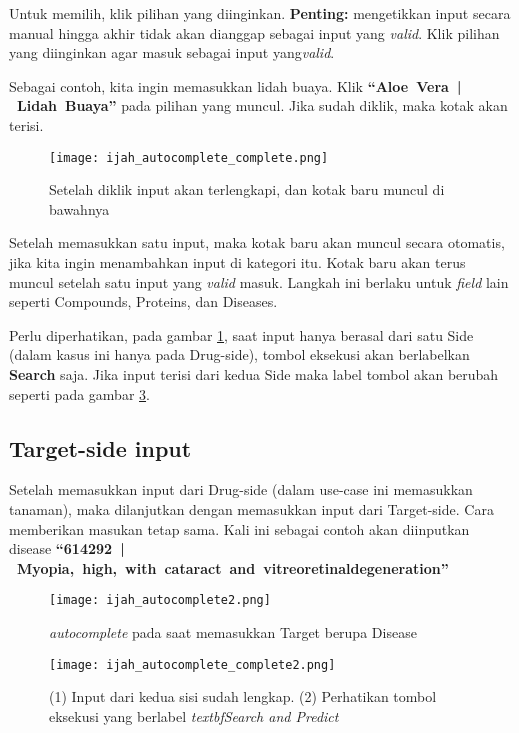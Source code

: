 	Untuk memilih, klik pilihan yang diinginkan. \textbf{Penting:} mengetikkan input secara manual hingga akhir tidak akan dianggap sebagai input yang \emph{valid}. Klik pilihan yang diinginkan agar masuk sebagai input yang\emph{valid}.

	Sebagai contoh, kita ingin memasukkan lidah buaya. Klik \mbox{\textbf{``Aloe Vera | Lidah Buaya''}} pada pilihan yang muncul. Jika sudah diklik, maka kotak akan terisi.

	\begin{figure}[H]
		\centering
		\texttt{[image: ijah\_autocomplete\_complete.png]}
		\caption{Setelah diklik input akan terlengkapi, dan kotak baru muncul di bawahnya}
		\label{fig:ijah_autocomplete_complete}
		\end{figure}

	Setelah memasukkan satu input, maka kotak baru akan muncul secara otomatis, jika kita ingin menambahkan input di kategori itu. Kotak baru akan terus muncul setelah satu input yang \emph{valid} masuk. Langkah ini berlaku untuk \emph{field} lain seperti Compounds, Proteins, dan Diseases.

	Perlu diperhatikan, pada gambar \ref{fig:ijah_autocomplete_complete}, saat input hanya berasal dari satu Side (dalam kasus ini hanya pada Drug-side), tombol eksekusi akan berlabelkan \textbf{Search} saja. Jika input terisi dari kedua Side maka label tombol akan berubah seperti pada gambar \ref{fig:ijah_autocomplete_complete2}.

	\subsection{Target-side input}
	Setelah memasukkan input dari Drug-side (dalam use-case ini memasukkan tanaman), maka dilanjutkan dengan memasukkan input dari Target-side. Cara memberikan masukan tetap sama. Kali ini sebagai contoh akan diinputkan disease \mbox{\textbf{``614292 | Myopia, high, with cataract and vitreoretinaldegeneration''}}

	\begin{figure}[H]
		\centering
		\texttt{[image: ijah\_autocomplete2.png]}
		\caption{\emph{autocomplete} pada saat memasukkan Target berupa Disease}
		\label{fig:ijah_autocomplete_click2}
		\end{figure}

	\begin{figure}[H]
		\centering
		\texttt{[image: ijah\_autocomplete\_complete2.png]}
		\caption{(1) Input dari kedua sisi sudah lengkap. (2) Perhatikan tombol eksekusi yang berlabel \emph{textbf{Search and Predict}}}
		\label{fig:ijah_autocomplete_complete2}
		\end{figure}


